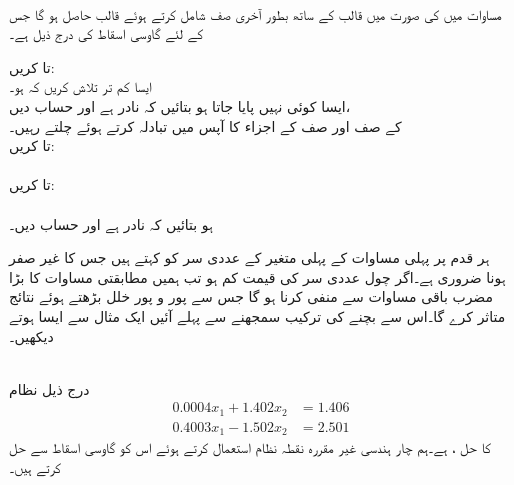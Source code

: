 \noindent\makebox[\linewidth]{\rule{\textwidth}{0.4pt}}
\\
مساوات  میں  کی صورت میں  قالب  کے ساتھ بطور آخری صف  شامل کرتے ہوئے  قالب  حاصل ہو گا جس کے لئے گاوسی اسقاط کی  درج ذیل ہے۔

 تا    کریں:\\
ایسا کم تر  تلاش کریں کہ  ہو۔\\
 ایسا کوئی  نہیں پایا جاتا ہو  بتائیں کہ  نادر ہے اور حساب  دیں،\\
  کے صف  اور صف  کے اجزاء کا آپس میں تبادلہ  کرتے ہوئے چلتے رہیں۔\\
 تا   کریں:\\
\\
 تا   کریں:\\
\\
  ہو  بتائیں کہ  نادر ہے اور حساب  دیں۔\\
\noindent\makebox[\linewidth]{\rule{\textwidth}{0.4pt}}

ہر قدم پر پہلی مساوات کے پہلی متغیر کے عددی سر کو  کہتے ہیں جس کا غیر صفر ہونا ضروری ہے۔اگر چول عددی سر کی قیمت کم ہو تب ہمیں مطابقتی مساوات کا بڑا مضرب باقی مساوات سے منفی کرنا ہو گا جس سے  پور و پور خلل بڑھتے ہوئے  نتائج متاثر کرے گا۔اس سے بچنے کی ترکیب سمجھنے سے پہلے آئیں ایک مثال سے ایسا ہوتے دیکھیں۔

\quad {}\\
درج ذیل نظام 
\begin{align*}
0.0004x_1+1.402x_2&=1.406\\
0.4003x_1-1.502x_2&=2.501
\end{align*}
کا حل ،  ہے۔ہم چار ہندسی غیر مقررہ نقطہ نظام استعمال کرتے ہوئے اس کو گاوسی اسقاط سے حل کرتے ہیں۔

